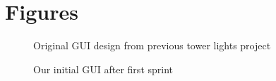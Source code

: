 \documentclass[11pt]{article} %
\begin{document}
\newpage
\section{Figures}
  
  \begin{figure}[H]
  	\centering
  	\caption{Original GUI design from previous tower lights project}
  	\label{fig:GUI Base Design Reference}
  \end{figure}
  
  
  \begin{figure}[H]
  	\centering
  	\caption{Our initial GUI after first sprint}
  	\label{fig:GUI Design 1}
  \end{figure}
  
\end{document}
